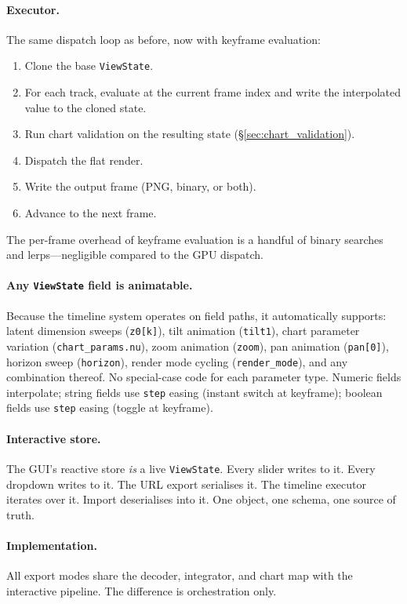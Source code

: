 \documentclass[11pt]{report}
\begin{document}
\paragraph{Executor.} The same dispatch loop as before, now with keyframe evaluation:
\begin{enumerate}[nosep]
\item Clone the base \texttt{ViewState}.
\item For each track, evaluate at the current frame index and write the interpolated value to the cloned state.
\item Run chart validation on the resulting state (\S\ref{sec:chart_validation}).
\item Dispatch the flat render.
\item Write the output frame (PNG, binary, or both).
\item Advance to the next frame.
\end{enumerate}
The per-frame overhead of keyframe evaluation is a handful of binary searches and lerps---negligible compared to the GPU dispatch.

\paragraph{Any \texttt{ViewState} field is animatable.} Because the timeline system operates on field paths, it automatically supports: latent dimension sweeps (\texttt{z0[k]}), tilt animation (\texttt{tilt1}), chart parameter variation (\texttt{chart\_params.nu}), zoom animation (\texttt{zoom}), pan animation (\texttt{pan[0]}), horizon sweep (\texttt{horizon}), render mode cycling (\texttt{render\_mode}), and any combination thereof. No special-case code for each parameter type. Numeric fields interpolate; string fields use \texttt{step} easing (instant switch at keyframe); boolean fields use \texttt{step} easing (toggle at keyframe).

\paragraph{Interactive store.} The GUI's reactive store \emph{is} a live \texttt{ViewState}. Every slider writes to it. Every dropdown writes to it. The URL export serialises it. The timeline executor iterates over it. Import deserialises into it. One object, one schema, one source of truth.


\paragraph{Implementation.} All export modes share the decoder, integrator, and chart map with the interactive pipeline. The difference is orchestration only.
\end{document}
